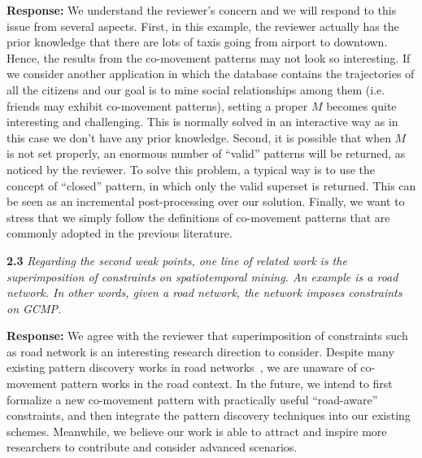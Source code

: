 \documentclass{vldb}
\begin{document}
\textbf{Response:} We understand the reviewer's concern and we will respond to this issue from several aspects. First, in this example, the reviewer actually has the prior knowledge that there are lots of taxis going from airport to downtown. Hence, the results from the co-movement patterns may not look so interesting. If we consider another application in which the database contains the trajectories of all the citizens and our goal is to mine social relationships among them (i.e. friends may exhibit co-movement patterns), setting a proper $M$ becomes quite interesting and challenging. This is normally solved in an interactive way as in this case we don't have any prior knowledge. Second, it is possible that when $M$ is not set properly, an enormous number of ``valid'' patterns will be returned, as noticed by the reviewer. To solve this problem, a typical way is to use the concept of ``closed'' pattern, in which only the valid superset is returned. This can be seen as an incremental post-processing over our solution. Finally, we want to stress that we simply follow the definitions of co-movement patterns that are commonly adopted in the previous literature.



\textbf{2.3} \emph{Regarding the second weak points, one line of related work is the superimposition
of constraints on spatiotemporal mining. An example is a road network. In other words, given a road network, the network imposes constraints on GCMP.}

\textbf{Response:}
We agree with the reviewer that superimposition of constraints such as road network is an interesting research direction to consider. Despite many existing pattern discovery works in road networks~\cite{yu2016spatial,liu2013uncovering,liu2015exploring,xuTaxi2016}, we
are unaware of co-movement pattern works in the road context. 
In the future, we intend
to first formalize a new co-movement pattern with practically useful ``road-aware'' constraints, and then integrate the pattern discovery techniques
into our existing schemes. Meanwhile, we believe our work is able to attract and inspire more 
researchers to contribute and consider advanced scenarios.

%
%
\end{document}
